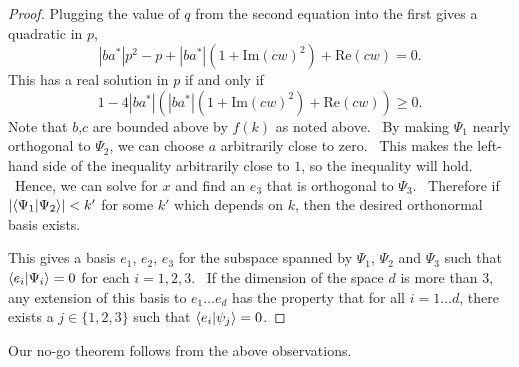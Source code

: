 \documentclass[letterpaper,12pt]{article}
\newcommand{\braket}[2]{\mbox{$ \langle #1 | #2 \rangle $}}
\begin{document}
\begin{proof}
\noindent Plugging the value of $q$ from the second equation into the first gives a quadratic in $p$,
\[
 |ba^*| p^2 - p + |ba^*| \left(1 + \mathrm{Im}(cw)^2\right) + \mathrm{Re}(cw) = 0.
\]
This has a real solution in $p$ if and only if
\[
1 - 4 |ba^*| \left(|ba^*|\left(1+ \mathrm{Im}(cw)^2\right) + \mathrm{Re}(cw)\right) \geq 0.
\]
Note that $b$,$c$ are bounded above by $f(k)$ as noted above. \ By making $\Psi_1$ nearly orthogonal to $\Psi_2$, we can choose $a$ arbitrarily close to zero. \ This makes the left-hand side of the inequality arbitrarily close to $1$, so the inequality will hold. \ Hence, we can solve for $x$ and find an $e_3$ that is orthogonal to $\Psi_3$. \ Therefore if $|\braket{\Psi_1}{\Psi_2}|<k'$ for some $k'$ which depends on $k$, then the desired orthonormal basis exists.

This gives a basis $e_1$, $e_2$, $e_3$ for the subspace spanned by $\Psi_1$, $\Psi_2$ and $\Psi_3$ such that $\braket{e_i}{\Psi_i}=0$ for each $i=1,2,3$. \ If the dimension of the space $d$ is more than $3$, any extension of this basis to $e_1 \ldots e_d$ has the property that for all $i=1\ldots d$, there exists a $j \in \{1,2,3\}$ such that $\braket{e_i}{\psi_j}=0$.

\end{proof}

Our no-go theorem follows from the above observations.
\end{document}
